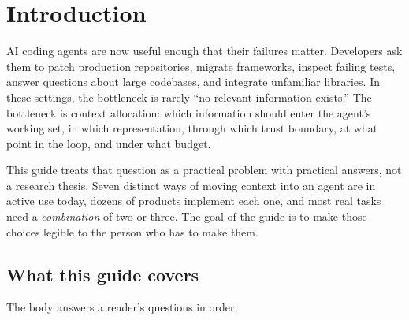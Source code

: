 \documentclass[
  11pt,
  letterpaper,
  numbers=noendperiod,
  parskip=half]{scrartcl}
\renewcommand*\contentsname{Table of contents}
\newcommand\contentsname{Table of contents}
\begin{document}
\renewcommand*\contentsname{Table of contents}
{
\hypersetup{linkcolor=black}
\setcounter{tocdepth}{3}
\tableofcontents
}

\section{Introduction}\label{sec-intro}

AI coding agents are now useful enough that their failures matter.
Developers ask them to patch production repositories, migrate
frameworks, inspect failing tests, answer questions about large
codebases, and integrate unfamiliar libraries. In these settings, the
bottleneck is rarely ``no relevant information exists.'' The bottleneck
is context allocation: which information should enter the agent's
working set, in which representation, through which trust boundary, at
what point in the loop, and under what budget.

\figureContextAtGlance

This guide treats that question as a practical problem with practical
answers, not a research thesis. Seven distinct ways of moving context
into an agent are in active use today, dozens of products implement each
one, and most real tasks need a \emph{combination} of two or three. The
goal of the guide is to make those choices legible to the person who
has to make them.

\subsection{What this guide covers}\label{sec-guide-scope}

The body answers a reader's questions in order:
\end{document}

